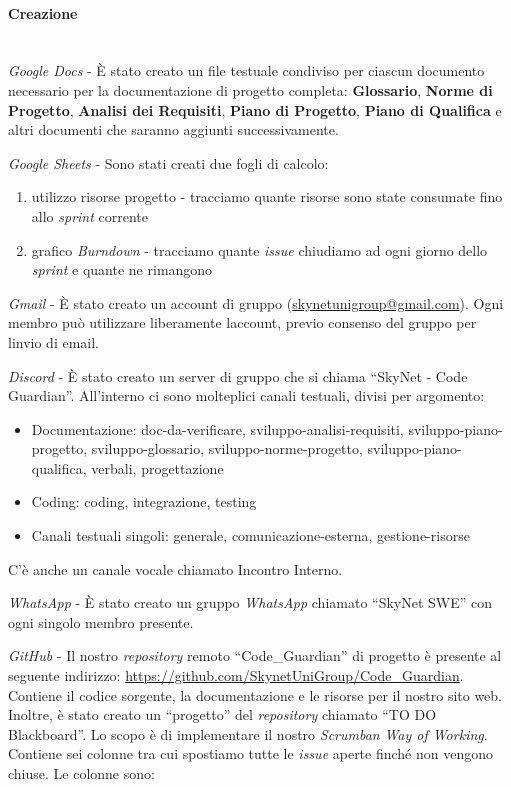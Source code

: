 \documentclass[12pt, a4paper]{article}
\begin{document}
 \paragraph{Creazione}\mbox{}\\
 \textit{Google Docs} - È stato creato un file testuale condiviso per ciascun documento necessario per la documentazione di progetto completa: \textbf{Glossario}, \textbf{Norme di Progetto}, \textbf{Analisi dei Requisiti}, \textbf{Piano di Progetto}, \textbf{Piano di Qualifica} e altri documenti che saranno aggiunti successivamente.
 
 \textit{Google Sheets} - Sono stati creati due fogli di calcolo:

\begin{enumerate}
\def\labelenumi{\arabic{enumi}.}
\item
  utilizzo risorse progetto - tracciamo quante risorse sono state consumate fino allo \textit{sprint} corrente
\item
  grafico \textit{Burndown} - tracciamo quante \textit{issue} chiudiamo ad ogni giorno dello \textit{sprint} e quante ne rimangono
\end{enumerate}

 \textit{Gmail} - È stato creato un account di gruppo (\href{mailto:skynetunigroup@gmail.com}{ {skynetunigroup@gmail.com}}). Ogni membro può utilizzare liberamente l\textquotesingle account, previo consenso del gruppo per l\textquotesingle invio di email.
 
 \textit{Discord} - È stato creato un server di gruppo che si chiama ``SkyNet - Code Guardian''. All'interno ci sono molteplici canali testuali, divisi per argomento:

\begin{itemize}
\item
  Documentazione: doc-da-verificare, sviluppo-analisi-requisiti, sviluppo-piano-progetto, sviluppo-glossario, sviluppo-norme-progetto, sviluppo-piano-qualifica, verbali, progettazione
\item
  Coding: coding, integrazione, testing
\item
  Canali testuali singoli: generale, comunicazione-esterna, gestione-risorse
\end{itemize}

C'è anche un canale vocale chiamato Incontro Interno.

 \textit{WhatsApp} - È stato creato un gruppo \textit{WhatsApp} chiamato ``SkyNet SWE'' con ogni singolo membro presente.
 
 \textit{GitHub} - Il nostro \textit{repository} remoto ``Code\_Guardian'' di progetto è presente al seguente indirizzo: \href{https://github.com/SkynetUniGroup/Code_Guardian}{ {https://github.com/SkynetUniGroup/Code\_Guardian}}. Contiene il codice sorgente, la documentazione e le risorse per il nostro sito web.\\
Inoltre, è stato creato un ``progetto'' del \textit{repository} chiamato ``TO DO Blackboard''. Lo scopo è di implementare il nostro \textit{Scrumban} \textit{Way of Working}. Contiene sei colonne tra cui spostiamo tutte le \textit{issue} aperte finché non vengono chiuse. Le colonne sono:
\end{document}
